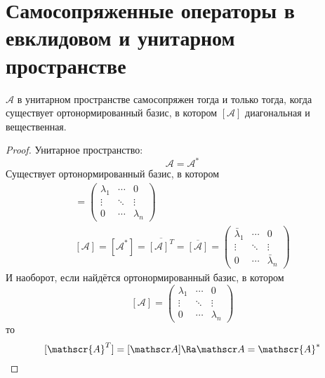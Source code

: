 \section{Самосопряженные операторы в евклидовом и унитарном пространстве}

\begin{theorem}
	$\mathscr A$ в унитарном пространстве самосопряжен тогда и только тогда, когда
	существует ортонормированный базис, в котором $[\mathscr A]$ диагональная и вещественная.
\end{theorem}
\begin{proof}
	Унитарное пространство:
	\[ \mathscr A = \mathscr{A}^* \]
	Существует ортонормированный базис, в котором
	\begin{gather*}
		[\mathscr A]
		= \begin{pmatrix}
			\lambda_1 & \cdots & 0 \\
			\vdots & \ddots & \vdots \\
			0 & \cdots & \lambda_n
		\end{pmatrix} \\
		[\mathscr A]
		= [\mathscr{A}^*]
		= \overline{[\mathscr A]^T}
		= \overline{[\mathscr A]}
		= \begin{pmatrix}
			\bar\lambda_1 & \cdots & 0 \\
			\vdots & \ddots & \vdots \\
			0 & \cdots & \bar\lambda_n
		\end{pmatrix}
	\end{gather*}
	И наоборот, если найдётся ортонормированный базис, в котором
	\[
		[\mathscr A]
		= \begin{pmatrix}
			\lambda_1 & \cdots & 0 \\
			\vdots & \ddots & \vdots \\
			0 & \cdots & \lambda_n
		\end{pmatrix}
	\]
	то
	\[
		[\mathscr{A}^T] = [\mathscr A] \Ra \mathscr A = \mathscr{A}^*
	\]
\end{proof}


